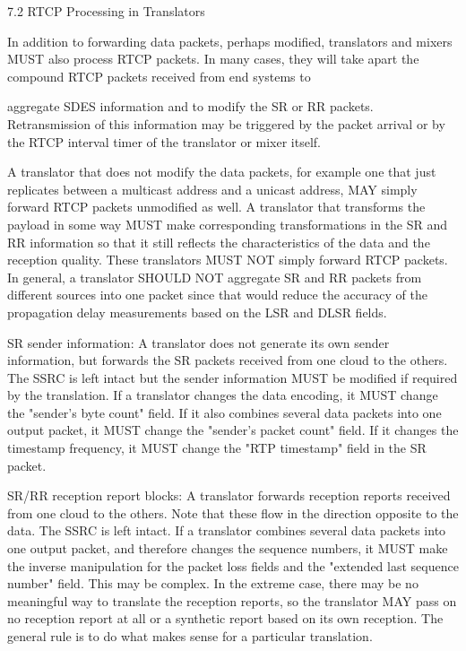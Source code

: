 \documentclass{article}
\begin{document}
7.2 RTCP Processing in Translators

In addition to forwarding data packets, perhaps modified, translators and mixers MUST also process RTCP packets.  In many cases, they will take apart the compound RTCP packets received from end systems to

aggregate SDES information and to modify the SR or RR packets. Retransmission of this information may be triggered by the packet arrival or by the RTCP interval timer of the translator or mixer itself.

A translator that does not modify the data packets, for example one that just replicates between a multicast address and a unicast address, MAY simply forward RTCP packets unmodified as well.  A translator that transforms the payload in some way MUST make corresponding transformations in the SR and RR information so that it still reflects the characteristics of the data and the reception quality.  These translators MUST NOT simply forward RTCP packets.  In general, a translator SHOULD NOT aggregate SR and RR packets from different sources into one packet since that would reduce the accuracy of the propagation delay measurements based on the LSR and DLSR fields.

SR sender information:  A translator does not generate its own sender information, but forwards the SR packets received from one cloud to the others.  The SSRC is left intact but the sender information MUST be modified if required by the translation.  If a translator changes the data encoding, it MUST change the "sender's byte count" field.  If it also combines several data packets into one output packet, it MUST change the "sender's packet count" field.  If it changes the timestamp frequency, it MUST change the "RTP timestamp" field in the SR packet.

SR/RR reception report blocks:  A translator forwards reception reports received from one cloud to the others.  Note that these flow in the direction opposite to the data.  The SSRC is left intact.  If a translator combines several data packets into one output packet, and therefore changes the sequence numbers, it MUST make the inverse manipulation for the packet loss fields and the "extended last sequence number" field.  This may be complex.  In the extreme case, there may be no meaningful way to translate the reception reports, so the translator MAY pass on no reception report at all or a synthetic report based on its own reception. The general rule is to do what makes sense for a particular translation.
\end{document}
